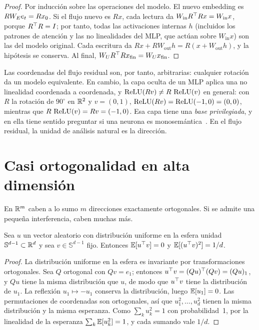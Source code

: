 \begin{proof}
Por inducción sobre las operaciones del modelo. El nuevo embedding es $RW_{E} e_t=Rx_0$. Si el flujo nuevo es $Rx$, cada lectura da $W_{\mathrm{in}}R^{\top} Rx=W_{\mathrm{in}}x$, porque $R^{\top} R=I$; por tanto, todas las activaciones internas $h$ (incluidos los patrones de atención y las no linealidades del MLP, que actúan sobre $W_{\mathrm{in}}x$) son las del modelo original. Cada escritura da $Rx+RW_{\mathrm{out}}h=R(x+W_{\mathrm{out}}h)$, y la hipótesis se conserva. Al final, $W_{U} R^{\top} Rx_{\mathrm{fin}}=W_{U} x_{\mathrm{fin}}$.
\end{proof}

Las coordenadas del flujo residual son, por tanto, arbitrarias: cualquier rotación da un modelo equivalente. En cambio, la capa oculta de un MLP aplica una no linealidad coordenada a coordenada, y $\operatorname{ReLU}(Rv)\neq R\,\operatorname{ReLU}(v)$ en general: con $R$ la rotación de $90^\circ$ en $\mathbb{R}^{2}$ y $v=(0,1)$, $\operatorname{ReLU}(Rv)=\operatorname{ReLU}(-1,0)=(0,0)$, mientras que $R\,\operatorname{ReLU}(v)=Rv=(-1,0)$. Esa capa tiene una \emph{base privilegiada}, y en ella tiene sentido preguntar si una neurona es monosemántica~\cite[«Privileged vs Non-privileged Bases»]{elhage22}. En el flujo residual, la unidad de análisis natural es la dirección.

\section{Casi ortogonalidad en alta dimensión}

En $\mathbb{R}^{m}$ caben a lo sumo $m$ direcciones exactamente ortogonales. Si se admite una pequeña interferencia, caben muchas más.

\begin{teorema}\label{teo:coseno}
Sea $u$ un vector aleatorio con distribución uniforme en la esfera unidad $\mathbb{S}^{d-1}\subset\mathbb{R}^{d}$ y sea $v\in\mathbb{S}^{d-1}$ fijo. Entonces $\mathbb{E}[u^{\top} v]=0$ y $\mathbb{E}[(u^{\top} v)^{2}]=1/d$.
\end{teorema}

\begin{proof}
La distribución uniforme en la esfera es invariante por transformaciones ortogonales. Sea $Q$ ortogonal con $Qv=e_1$; entonces $u^{\top} v=(Qu)^{\top}(Qv)=(Qu)_1$, y $Qu$ tiene la misma distribución que $u$, de modo que $u^{\top} v$ tiene la distribución de $u_1$. La reflexión $u_1\mapsto -u_1$ conserva la distribución, luego $\mathbb{E}[u_1]=0$. Las permutaciones de coordenadas son ortogonales, así que $u_1^{2},\dots,u_d^{2}$ tienen la misma distribución y la misma esperanza. Como $\sum_ku_k^{2}=1$ con probabilidad~1, por la linealidad de la esperanza $\sum_k\mathbb{E}[u_k^{2}]=1$, y cada sumando vale $1/d$.
\end{proof}

